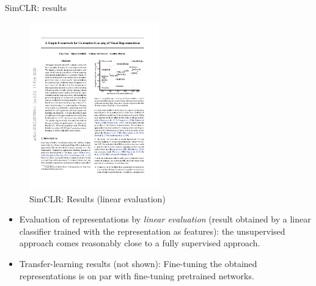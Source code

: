 \documentclass[xcolor=pdftex,dvipsnames,table]{beamer}
\begin{document}
\begin{frame}{SimCLR: results}
\begin{figure}[htb]
   \centering
   \includegraphics[width=0.5\textwidth]{../graphics/simclr_benchmark.pdf}
   \caption{SimCLR: Results (linear evaluation) \cite{Chen2020}}
\end{figure}
\begin{itemize}
\item Evaluation of representations by \emph{linear evaluation} (result obtained by a linear classifier trained with the representation as features): the unsupervised approach comes reasonably close to a fully supervised approach. 
\item Transfer-learning results (not shown): Fine-tuning the obtained representations is on par with fine-tuning pretrained networks. 
\end{itemize}
\end{frame}
\end{document}
